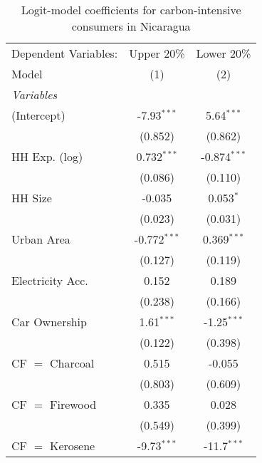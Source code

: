 
\begin{table}[htbp!]
   \centering
   \small
   \begin{adjustbox}{width = 1\textwidth, max height = 0.95\textheight, center}
      \begin{threeparttable}[b]
         \caption{\label{tab:Logit_1_NIC} Logit-model coefficients for carbon-intensive consumers in Nicaragua}
         \begin{tabular}{lcc}
            \tabularnewline \midrule \midrule
            Dependent Variables: & Upper 20\%     & Lower 20\%\\   
            Model                & (1)            & (2)\\  
            \midrule
            \emph{Variables}\\
            (Intercept)          & -7.93$^{***}$  & 5.64$^{***}$\\   
                                 & (0.852)        & (0.862)\\   
            HH Exp. (log)        & 0.732$^{***}$  & -0.874$^{***}$\\   
                                 & (0.086)        & (0.110)\\   
            HH Size              & -0.035         & 0.053$^{*}$\\   
                                 & (0.023)        & (0.031)\\   
            Urban Area           & -0.772$^{***}$ & 0.369$^{***}$\\   
                                 & (0.127)        & (0.119)\\   
            Electricity Acc.     & 0.152          & 0.189\\   
                                 & (0.238)        & (0.166)\\   
            Car Ownership        & 1.61$^{***}$   & -1.25$^{***}$\\   
                                 & (0.122)        & (0.398)\\   
            CF $=$ Charcoal      & 0.515          & -0.055\\   
                                 & (0.803)        & (0.609)\\   
            CF $=$ Firewood      & 0.335          & 0.028\\   
                                 & (0.549)        & (0.399)\\   
            CF $=$ Kerosene      & -9.73$^{***}$  & -11.7$^{***}$\\   

\end{tabular}
\end{threeparttable}
\end{adjustbox}
\end{table}
